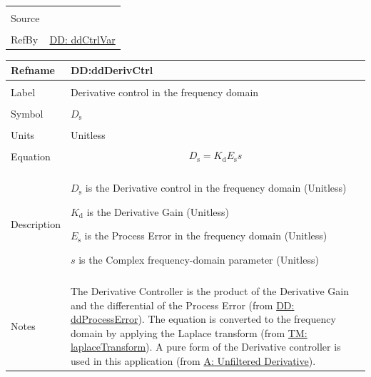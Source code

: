 \documentclass[12pt]{article}
\begin{document}
\begin{minipage}{\textwidth}
\begin{tabular}{>{\raggedright}p{}>{\raggedright\arraybackslash}p{}}
\\ \midrule \\
Source & \cite{johnson2008}
         
\\ \midrule \\
RefBy & \hyperref[DD:ddCtrlVar]{DD: ddCtrlVar}
        
\\ \bottomrule
\end{tabular}
\end{minipage}

\vspace{\baselineskip}
\noindent
\begin{minipage}{\textwidth}
\begin{tabular}{>{\raggedright}p{}>{\raggedright\arraybackslash}p{}}
\toprule \textbf{Refname} & \textbf{DD:ddDerivCtrl}
\label{DD:ddDerivCtrl}
\\ \midrule \\
Label & Derivative control in the frequency domain
        
\\ \midrule \\
Symbol & ${D_{\text{s}}}$
         
\\ \midrule \\
Units & Unitless
        
\\ \midrule \\
Equation & \begin{displaymath}
           {D_{\text{s}}}={K_{\text{d}}} {E_{\text{s}}} s
           \end{displaymath}
\\ \midrule \\
Description & \begin{symbDescription}
              \item{${D_{\text{s}}}$ is the Derivative control in the frequency domain (Unitless)}
              \item{${K_{\text{d}}}$ is the Derivative Gain (Unitless)}
              \item{${E_{\text{s}}}$ is the Process Error in the frequency domain (Unitless)}
              \item{$s$ is the Complex frequency-domain parameter (Unitless)}
              \end{symbDescription}
\\ \midrule \\
Notes & The Derivative Controller is the product of the Derivative Gain and the differential of the Process Error (from \hyperref[DD:ddProcessError]{DD: ddProcessError}). The equation is converted to the frequency domain by applying the Laplace transform (from \hyperref[TM:laplaceTransform]{TM: laplaceTransform}). A pure form of the Derivative controller is used in this application (from \hyperref[unfilteredDerivative]{A: Unfiltered Derivative}).
        

\end{tabular}
\end{minipage}
\end{document}
